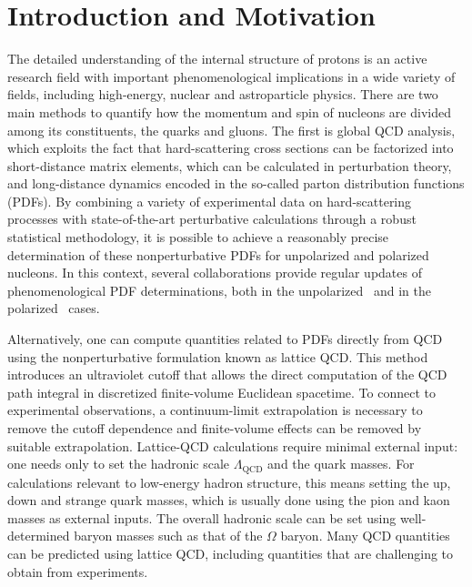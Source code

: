 \section{Introduction and Motivation}

The detailed understanding of the internal structure of protons is an active
research field with important phenomenological implications in a wide variety of fields,
including high-energy, nuclear and astroparticle physics.
%
There are two main methods to quantify how the momentum and spin of nucleons
are divided among its constituents, the quarks and gluons.
%
The first is global QCD analysis, which exploits the fact that hard-scattering
cross sections can be factorized into short-distance matrix elements, which can
be calculated in perturbation theory, and long-distance dynamics encoded in the
so-called parton distribution functions (PDFs).
%
By combining a variety of experimental data on hard-scattering processes
with state-of-the-art perturbative calculations through a robust statistical
methodology, it is possible to achieve a reasonably precise determination
of these nonperturbative PDFs for unpolarized and polarized nucleons.
%
In this context, several collaborations provide regular updates of
phenomenological PDF determinations, both
in the unpolarized~\cite{Ball:2012cx,Ball:2014uwa,Harland-Lang:2014zoa,
Dulat:2015mca,Alekhin:2017kpj,Owens:2012bv} and in
the polarized~\cite{Nocera:2014gqa,deFlorian:2009vb} cases.

Alternatively, one can compute quantities related to PDFs directly 
from QCD using the nonperturbative formulation known as lattice QCD.
%
This method introduces an ultraviolet cutoff that allows the direct 
computation of the QCD path integral in discretized finite-volume 
Euclidean spacetime. To connect to experimental observations, a 
continuum-limit extrapolation is necessary to remove the cutoff dependence 
and finite-volume effects can be removed by suitable extrapolation. 
Lattice-QCD calculations require minimal external input: one needs only to 
set the hadronic scale $\Lambda_\text{QCD}$ and the quark masses. 
For calculations relevant to low-energy hadron structure, this means
setting the up, down and strange quark masses,
which is usually done using the pion and kaon masses as external inputs. 
The overall hadronic scale can be set using well-determined baryon masses 
such as that of the $\Omega$ baryon. Many QCD quantities can be predicted 
using lattice QCD, including quantities that are challenging to obtain from experiments. 

